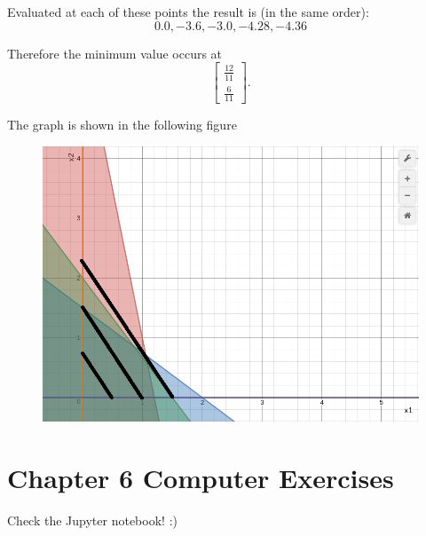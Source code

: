 \documentclass[12pt,a4paper]{report}
\newcommand{\mat}[1]{\left[ \begin{smallmatrix} #1 \end{smallmatrix} \right]}
\begin{document}
Evaluated at each of these points the result is (in the same order):
$$0.0, -3.6, -3.0, -4.28, -4.36$$

Therefore the minimum value occurs at $$\mat{\frac{12}{11}\\ \frac{6}{11}}.$$

The graph is shown in the following figure

\begin{center}
\begin{figure}
\includegraphics[width=\textwidth]{question64.png} 
\end{figure}
\end{center}

\section*{Chapter 6 Computer Exercises}
Check the Jupyter notebook! :)
\end{document}
